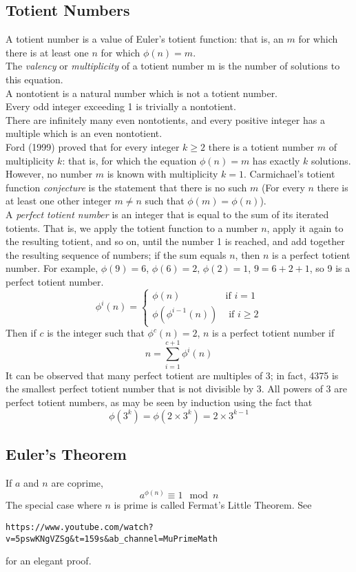 \documentclass[12pt]{extarticle}
\begin{document}
\subsection*{Totient Numbers}
A totient number is a value of Euler's totient function: that is, an $m$ for which there is at least one $n$ for which $\phi(n) = m$. \\
The \emph{valency} or \emph{multiplicity} of a totient number m is the number of solutions to this equation. \\
A nontotient is a natural number which is not a totient number.\\
Every odd integer exceeding 1 is trivially a nontotient.\\
There are infinitely many even nontotients, and every positive integer has a multiple which is an even nontotient.\\
Ford (1999) proved that for every integer $k \geq 2$ there is a totient number $m$ of multiplicity $k$: that is, for which the equation $\phi(n) = m$ has exactly $k$ solutions.\\
However, no number $m$ is known with multiplicity $k = 1$. Carmichael's totient function \textit{conjecture} is the statement that there is no such $m$ (For every $n$ there is at least one other integer $m\not=n$ such that $\phi(m)=\phi(n)$). \\
A \emph{perfect totient number} is an integer that is equal to the sum of its iterated totients. That is, we apply the totient function to a number $n$, apply it again to the resulting totient, and so on, until the number 1 is reached, and add together the resulting sequence of numbers; if the sum equals $n$, then $n$ is a perfect totient number. For example, $\phi(9)=6$, $\phi(6)=2$, $\phi(2)=1$, $9=6+2+1$, so 9 is a perfect totient number.
$$\phi^{i}(n)=\begin{cases}\phi(n)&\text{if }i = 1\\\phi(\phi^{i-1}(n))&\text{ if }i\geq 2 \end{cases}$$
Then if $c$ is the integer such that $\phi^{c}(n)=2$, $n$ is a perfect totient number if $$n=\sum_{i=1}^{c+1}\phi^{i}(n)$$
It can be observed that many perfect totient are multiples of 3; in fact, 4375 is the smallest perfect totient number that is not divisible by 3. All powers of 3 are perfect totient numbers, as may be seen by induction using the fact that
$$\phi(3^{k})=\phi(2\times 3^{k})=2\times 3^{k-1}$$
\subsection*{Euler's Theorem}
If $a$ and $n$ are coprime, 
$$a^{\phi(n)}\equiv 1 \mod n$$
The special case where $n$ is prime is called Fermat's Little Theorem.
See \begin{verbatim}https://www.youtube.com/watch?v=5pswKNgVZSg&t=159s&ab_channel=MuPrimeMath\end{verbatim} 
for an elegant proof.
\end{document}
